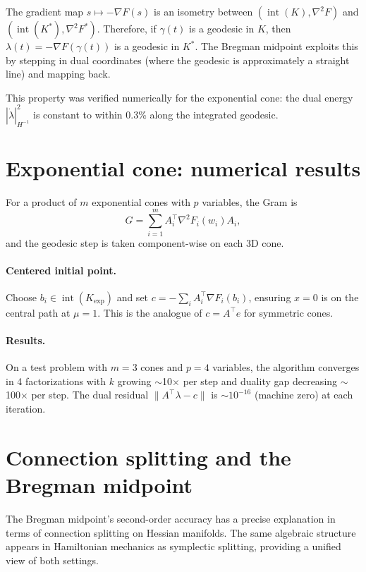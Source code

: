 \documentclass[11pt]{article}
\begin{document}
The gradient map $s \mapsto -\nabla F(s)$ is an isometry between
$(\operatorname{int}(K), \nabla^2 F)$ and $(\operatorname{int}(K^*), \nabla^2 F^*)$.
Therefore, if $\gamma(t)$ is a geodesic in $K$, then $\lambda(t) = -\nabla F(\gamma(t))$
is a geodesic in $K^*$.  The Bregman midpoint exploits this by stepping in dual
coordinates (where the geodesic is approximately a straight line) and mapping back.

This property was verified numerically for the exponential cone: the dual
energy $|\dot\lambda|^2_{H^{-1}}$ is constant to within 0.3\% along the
integrated geodesic.

\section{Exponential cone: numerical results}

For a product of $m$ exponential cones with $p$ variables, the Gram is
\[
  G = \sum_{i=1}^m A_i^\top \nabla^2 F_i(w_i) A_i,
\]
and the geodesic step is taken component-wise on each 3D cone.

\paragraph{Centered initial point.}
Choose $b_i \in \operatorname{int}(K_{\exp})$ and set
$c = -\sum_i A_i^\top \nabla F_i(b_i)$, ensuring $x = 0$ is on the central path
at $\mu = 1$.  This is the analogue of $c = A^\top e$ for symmetric cones.

\paragraph{Results.}
On a test problem with $m = 3$ cones and $p = 4$ variables,
the algorithm converges in 4 factorizations with $k$ growing $\sim$10$\times$
per step and duality gap decreasing $\sim$100$\times$ per step.  The dual
residual $\|A^\top \lambda - c\|$ is $\sim 10^{-16}$ (machine zero) at each
iteration.

\section{Connection splitting and the Bregman midpoint}
\label{sec:splitting}

The Bregman midpoint's second-order accuracy has a precise explanation
in terms of connection splitting on Hessian manifolds.  The same
algebraic structure appears in Hamiltonian mechanics as symplectic
splitting, providing a unified view of both settings.
\end{document}
